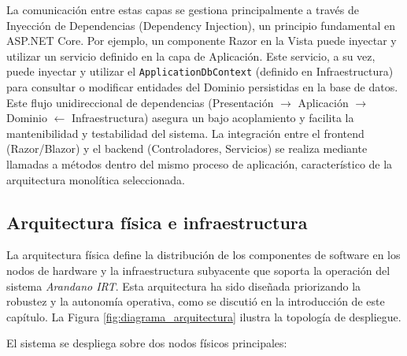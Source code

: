 La comunicación entre estas capas se gestiona principalmente a través de Inyección de Dependencias (Dependency Injection), un principio fundamental en ASP.NET Core. Por ejemplo, un componente Razor en la Vista puede inyectar y utilizar un servicio definido en la capa de Aplicación. Este servicio, a su vez, puede inyectar y utilizar el \texttt{ApplicationDbContext} (definido en Infraestructura) para consultar o modificar entidades del Dominio persistidas en la base de datos. Este flujo unidireccional de dependencias (Presentación $\rightarrow$ Aplicación $\rightarrow$ Dominio $\leftarrow$ Infraestructura) asegura un bajo acoplamiento y facilita la mantenibilidad y testabilidad del sistema. La integración entre el frontend (Razor/Blazor) y el backend (Controladores, Servicios) se realiza mediante llamadas a métodos dentro del mismo proceso de aplicación, característico de la arquitectura monolítica seleccionada.


\subsection{Arquitectura física e infraestructura}

La arquitectura física define la distribución de los componentes de software en los nodos de hardware y la infraestructura subyacente que soporta la operación del sistema \textit{Arandano IRT}. Esta arquitectura ha sido diseñada priorizando la robustez y la autonomía operativa, como se discutió en la introducción de este capítulo. La Figura \ref{fig:diagrama_arquitectura} ilustra la topología de despliegue.

El sistema se despliega sobre dos nodos físicos principales:

